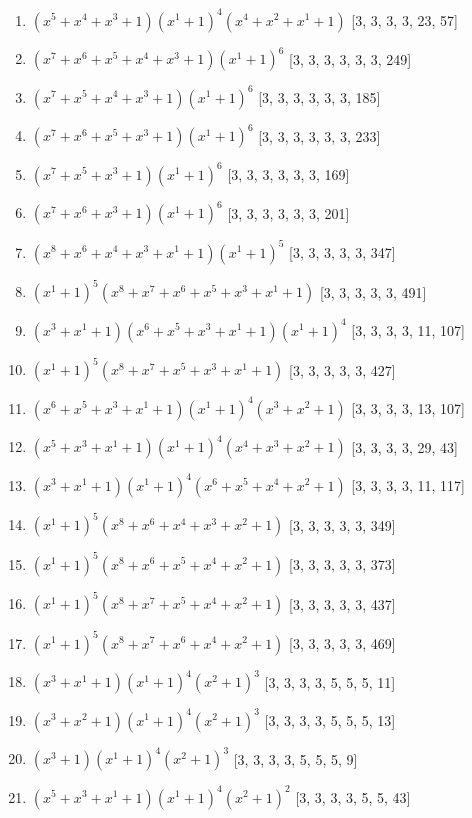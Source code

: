 \documentclass[10pt,twocolumn]{article}
\begin{document}
\begin{enumerate}
\item $(x^{5} + x^{4} + x^{3} + 1)(x^{1} + 1)^{4}(x^{4} + x^{2} + x^{1} + 1)$  [3, 3, 3, 3, 23, 57]
\item $(x^{7} + x^{6} + x^{5} + x^{4} + x^{3} + 1)(x^{1} + 1)^{6}$  [3, 3, 3, 3, 3, 3, 249]
\item $(x^{7} + x^{5} + x^{4} + x^{3} + 1)(x^{1} + 1)^{6}$  [3, 3, 3, 3, 3, 3, 185]
\item $(x^{7} + x^{6} + x^{5} + x^{3} + 1)(x^{1} + 1)^{6}$  [3, 3, 3, 3, 3, 3, 233]
\item $(x^{7} + x^{5} + x^{3} + 1)(x^{1} + 1)^{6}$  [3, 3, 3, 3, 3, 3, 169]
\item $(x^{7} + x^{6} + x^{3} + 1)(x^{1} + 1)^{6}$  [3, 3, 3, 3, 3, 3, 201]
\item $(x^{8} + x^{6} + x^{4} + x^{3} + x^{1} + 1)(x^{1} + 1)^{5}$  [3, 3, 3, 3, 3, 347]
\item $(x^{1} + 1)^{5}(x^{8} + x^{7} + x^{6} + x^{5} + x^{3} + x^{1} + 1)$  [3, 3, 3, 3, 3, 491]
\item $(x^{3} + x^{1} + 1)(x^{6} + x^{5} + x^{3} + x^{1} + 1)(x^{1} + 1)^{4}$  [3, 3, 3, 3, 11, 107]
\item $(x^{1} + 1)^{5}(x^{8} + x^{7} + x^{5} + x^{3} + x^{1} + 1)$  [3, 3, 3, 3, 3, 427]
\item $(x^{6} + x^{5} + x^{3} + x^{1} + 1)(x^{1} + 1)^{4}(x^{3} + x^{2} + 1)$  [3, 3, 3, 3, 13, 107]
\item $(x^{5} + x^{3} + x^{1} + 1)(x^{1} + 1)^{4}(x^{4} + x^{3} + x^{2} + 1)$  [3, 3, 3, 3, 29, 43]
\item $(x^{3} + x^{1} + 1)(x^{1} + 1)^{4}(x^{6} + x^{5} + x^{4} + x^{2} + 1)$  [3, 3, 3, 3, 11, 117]
\item $(x^{1} + 1)^{5}(x^{8} + x^{6} + x^{4} + x^{3} + x^{2} + 1)$  [3, 3, 3, 3, 3, 349]
\item $(x^{1} + 1)^{5}(x^{8} + x^{6} + x^{5} + x^{4} + x^{2} + 1)$  [3, 3, 3, 3, 3, 373]
\item $(x^{1} + 1)^{5}(x^{8} + x^{7} + x^{5} + x^{4} + x^{2} + 1)$  [3, 3, 3, 3, 3, 437]
\item $(x^{1} + 1)^{5}(x^{8} + x^{7} + x^{6} + x^{4} + x^{2} + 1)$  [3, 3, 3, 3, 3, 469]
\item $(x^{3} + x^{1} + 1)(x^{1} + 1)^{4}(x^{2} + 1)^{3}$  [3, 3, 3, 3, 5, 5, 5, 11]
\item $(x^{3} + x^{2} + 1)(x^{1} + 1)^{4}(x^{2} + 1)^{3}$  [3, 3, 3, 3, 5, 5, 5, 13]
\item $(x^{3} + 1)(x^{1} + 1)^{4}(x^{2} + 1)^{3}$  [3, 3, 3, 3, 5, 5, 5, 9]
\item $(x^{5} + x^{3} + x^{1} + 1)(x^{1} + 1)^{4}(x^{2} + 1)^{2}$  [3, 3, 3, 3, 5, 5, 43]

\end{enumerate}
\end{document}
